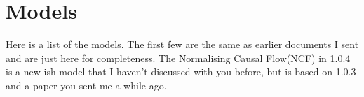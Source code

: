 \documentclass{article}
\begin{document}






\section{Models}
Here is a list of the models. The first few are the same as earlier documents I sent and are just here for completeness. The Normalising Causal Flow(NCF) in 1.0.4 is a new-ish model that I haven't discussed with you before, but is based on 1.0.3 and a paper you sent me a while ago.
\end{document}
